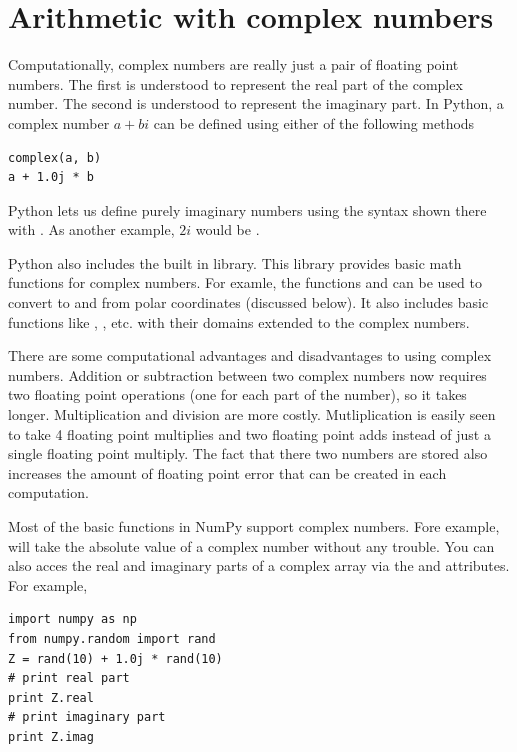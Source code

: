 

\section*{Arithmetic with complex numbers}
Computationally, complex numbers are really just a pair of floating point numbers.
The first is understood to represent the real part of the complex number.
The second is understood to represent the imaginary part.
In Python, a complex number $a + b i$ can be defined using either of the following methods
\begin{lstlisting}
complex(a, b)
a + 1.0j * b
\end{lstlisting}
Python lets us define purely imaginary numbers using the syntax shown there with .
As another example, $2 i$ would be .

Python also includes the built in  library.
This library provides basic math functions for complex numbers.
For examle, the functions  and  can be used to convert to and from polar coordinates (discussed below).
It also includes basic functions like , , etc. with their domains extended to the complex numbers.

There are some computational advantages and disadvantages to using complex numbers.
Addition or subtraction between two complex numbers now requires two floating point operations (one for each part of the number), so it takes longer.
Multiplication and division are more costly.
Mutliplication is easily seen to take 4 floating point multiplies and two floating point adds instead of just a single floating point multiply.
The fact that there two numbers are stored also increases the amount of floating point error that can be created in each computation.

Most of the basic functions in NumPy support complex numbers.
Fore example,  will take the absolute value of a complex number without any trouble.
You can also acces the real and imaginary parts of a complex array via the  and  attributes.
For example,
\begin{lstlisting}
import numpy as np
from numpy.random import rand
Z = rand(10) + 1.0j * rand(10)
# print real part
print Z.real
# print imaginary part
print Z.imag
\end{lstlisting}

